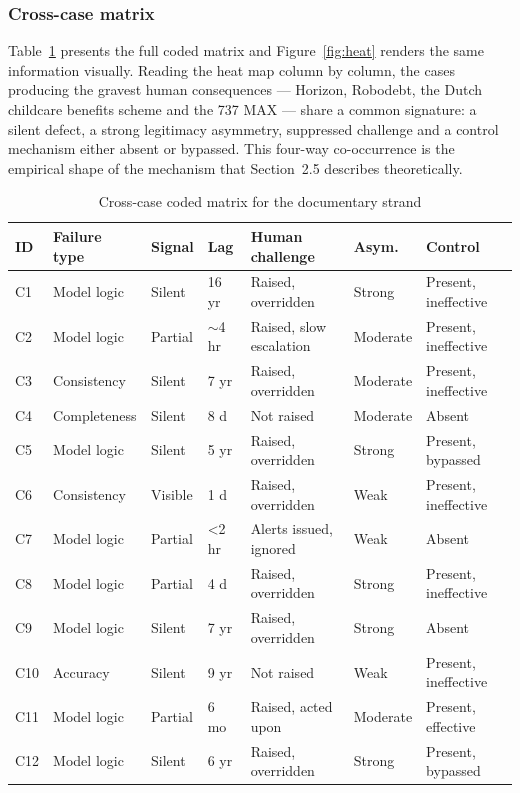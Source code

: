 \documentclass[11pt,a4paper]{article}
\numberwithin{figure}{section}
\numberwithin{table}{section}
\begin{document}
\subsubsection{Cross-case matrix}

Table~\ref{tab:coded} presents the full coded matrix and Figure~\ref{fig:heat} renders the same information
visually. Reading the heat map column by column, the cases producing the gravest human consequences ---
Horizon, Robodebt, the Dutch childcare benefits scheme and the 737 MAX --- share a common signature: a
silent defect, a strong legitimacy asymmetry, suppressed challenge and a control mechanism either absent or
bypassed. This four-way co-occurrence is the empirical shape of the mechanism that Section~2.5 describes
theoretically.

\begin{table}[H]
\centering\footnotesize
\caption{Cross-case coded matrix for the documentary strand}
\label{tab:coded}
\begin{tabularx}{\textwidth}{@{}p{0.7cm} p{1.9cm} p{1.4cm} p{1.2cm} X p{1.5cm} p{2.4cm}@{}}
\toprule
\textbf{ID} & \textbf{Failure type} & \textbf{Signal} & \textbf{Lag} & \textbf{Human challenge} &
\textbf{Asym.} & \textbf{Control} \\
\midrule
C1 & Model logic & Silent & 16 yr & Raised, overridden & Strong & Present, ineffective \\
C2 & Model logic & Partial & $\sim$4 hr & Raised, slow escalation & Moderate & Present, ineffective \\
C3 & Consistency & Silent & 7 yr & Raised, overridden & Moderate & Present, ineffective \\
C4 & Completeness & Silent & 8 d & Not raised & Moderate & Absent \\
C5 & Model logic & Silent & 5 yr & Raised, overridden & Strong & Present, bypassed \\
C6 & Consistency & Visible & 1 d & Raised, overridden & Weak & Present, ineffective \\
C7 & Model logic & Partial & <2 hr & Alerts issued, ignored & Weak & Absent \\
C8 & Model logic & Partial & 4 d & Raised, overridden & Strong & Present, ineffective \\
C9 & Model logic & Silent & 7 yr & Raised, overridden & Strong & Absent \\
C10 & Accuracy & Silent & 9 yr & Not raised & Weak & Present, ineffective \\
C11 & Model logic & Partial & 6 mo & Raised, acted upon & Moderate & Present, effective \\
C12 & Model logic & Silent & 6 yr & Raised, overridden & Strong & Present, bypassed \\
\bottomrule
\end{tabularx}
\end{table}
\end{document}
